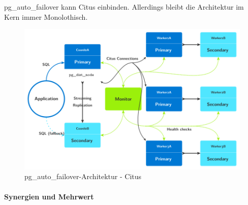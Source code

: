 \begin{flushleft}
    pg\_auto\_failover kann Citus einbinden\cite{3FVHLIFE}.
    Allerdings bleibt die Architektur im Kern immer Monolothisch.
    \begin{figure}[H]
        \centering
        \includegraphics[width=0.75\linewidth]{source/implementation/evaluation/postgresql_ha_solutions/pg_auto_failover/pg_auto-failover_arch-citus}
        \caption{pg\_auto\_failover-Architektur - Citus}
        \label{fig:pg_auto-failover_arch-citus}
    \end{figure}
\end{flushleft}
\begin{flushleft}
    \paragraph{Synergien und Mehrwert}

\end{flushleft}